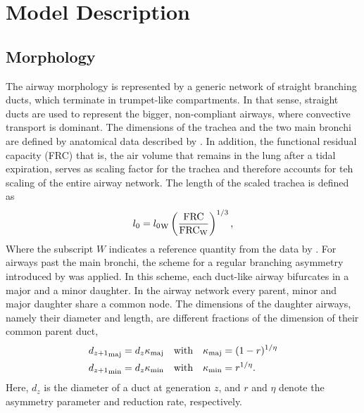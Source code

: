 \chapter{Model Description}\label{cha:model_description}



\section{Morphology} \label{sec:morphology}
The airway morphology is represented by a generic network of straight branching ducts, which terminate in trumpet-like compartments.
In that sense, straight ducts are used to represent the bigger, non-compliant airways, where convective transport is dominant.
The dimensions of the trachea and the two main bronchi are defined by anatomical data described by \citet{Weibel1963}.
In addition, the functional residual capacity (FRC) that is, the air volume that remains in the lung after a tidal expiration, serves as scaling factor for the trachea and therefore accounts for teh scaling of the entire airway network.
The length of the scaled trachea is defined as
\begin{equation}
l_0 = {l_0}_\mathrm{W}\left(\frac{\mathrm{FRC}}{\mathrm{FRC}_\mathrm{W}}\right)^{1/3} \text{,}
\end{equation}
Where the subscript $W$ indicates a reference quantity from the data by \citet{Weibel1963}.
For airways past the main bronchi, the scheme for a regular branching asymmetry introduced by \cite{Majumdar2005} was applied.
In this scheme, each duct-like airway bifurcates in a major and a minor daughter.
In the airway network every parent, minor and major daughter share a common node.
The dimensions of the daughter airways, namely their diameter and length, are different fractions of the dimension of their common parent duct,
\begin{equation} \label{eqn:bifurcationRule}
\begin{split}
{d_{z+1}}_{\mathrm{maj}} &= d_{z}\kappa_\mathrm{maj} \quad\text{with}\quad \kappa_\mathrm{maj} = (1-r)^{1/\eta}\\
{d_{z+1}}_{\mathrm{min}} &= d_{z}\kappa_\mathrm{min} \quad\text{with}\quad \kappa_\mathrm{min} = r^{1/\eta} \text{.}
\end{split}
\end{equation}
Here, $d_z$ is the diameter of a duct at generation $z$, and $r$ and $\eta$ denote the asymmetry parameter and reduction rate, respectively.
